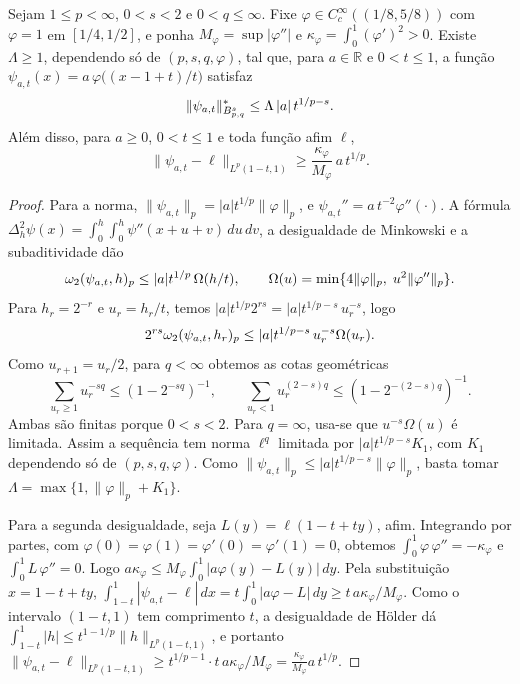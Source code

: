 \documentclass[12pt,a4paper]{article}
\begin{document}
\begin{lema}
\label{lp:lem:bump}
Sejam $1\le p<\infty$, $0<s<2$ e $0<q\le\infty$. Fixe $\varphi\in C^\infty_c((1/8,5/8))$ com $\varphi=1$ em $[1/4,1/2]$, e ponha $M_\varphi=\sup|\varphi''|$ e $\kappa_\varphi=\int_0^1(\varphi')^2>0$. Existe $\Lambda\ge1$, dependendo só de $(p,s,q,\varphi)$, tal que, para $a\in\mathbb R$ e $0<t\le1$, a função $\psi_{a,t}(x)=a\,\varphi\bigl((x-1+t)/t\bigr)$ satisfaz
\[
 \|\psi_{a,t}\|^*_{B^{s}_{p,q}}\le\Lambda\,|a|\,t^{1/p-s}.
\]
Além disso, para $a\ge0$, $0<t\le1$ e toda função afim $\ell$,
\[
 \|\psi_{a,t}-\ell\|_{L^p(1-t,1)}\ge\frac{\kappa_\varphi}{M_\varphi}\,a\,t^{1/p}.
\]
\end{lema}

\begin{proof}
Para a norma, $\|\psi_{a,t}\|_p=|a|t^{1/p}\|\varphi\|_p$, e $\psi_{a,t}''=a\,t^{-2}\varphi''(\cdot)$. A fórmula $\Delta_h^2\psi(x)=\int_0^h\!\int_0^h\psi''(x+u+v)\,du\,dv$, a desigualdade de Minkowski e a subaditividade dão
\[
 \omega_2(\psi_{a,t},h)_{p}\le|a|t^{1/p}\,\Omega(h/t),\qquad \Omega(u)=\min\{4\|\varphi\|_p,\;u^2\|\varphi''\|_p\}.
\]
Para $h_r=2^{-r}$ e $u_r=h_r/t$, temos $|a|t^{1/p}2^{rs}=|a|t^{1/p-s}\,u_r^{-s}$, logo
\[
 2^{rs}\omega_2(\psi_{a,t},h_r)_{p}\le|a|t^{1/p-s}\,u_r^{-s}\Omega(u_r).
\]
Como $u_{r+1}=u_r/2$, para $q<\infty$ obtemos as cotas geométricas
\[
 \sum_{u_r\ge1}u_r^{-sq}\le(1-2^{-sq})^{-1},
 \qquad \sum_{u_r<1}u_r^{(2-s)q}\le(1-2^{-(2-s)q})^{-1}.
\]
Ambas são finitas porque $0<s<2$. Para $q=\infty$, usa-se que $u^{-s}\Omega(u)$ é limitada. Assim a sequência tem norma $\ell^q$ limitada por $|a|t^{1/p-s}K_1$, com $K_1$ dependendo só de $(p,s,q,\varphi)$. Como $\|\psi_{a,t}\|_p\le|a|t^{1/p-s}\|\varphi\|_p$, basta tomar $\Lambda=\max\{1,\|\varphi\|_p+K_1\}$.

Para a segunda desigualdade, seja $L(y)=\ell(1-t+ty)$, afim. Integrando por partes, com $\varphi(0)=\varphi(1)=\varphi'(0)=\varphi'(1)=0$, obtemos $\int_0^1\varphi\,\varphi''=-\kappa_\varphi$ e $\int_0^1 L\,\varphi''=0$. Logo $a\kappa_\varphi\le M_\varphi\int_0^1|a\varphi(y)-L(y)|\,dy$. Pela substituição $x=1-t+ty$, $\int_{1-t}^1|\psi_{a,t}-\ell|\,dx=t\int_0^1|a\varphi-L|\,dy\ge t\,a\kappa_\varphi/M_\varphi$. Como o intervalo $(1-t,1)$ tem comprimento $t$, a desigualdade de Hölder dá $\int_{1-t}^1|h|\le t^{1-1/p}\|h\|_{L^p(1-t,1)}$, e portanto $\|\psi_{a,t}-\ell\|_{L^p(1-t,1)}\ge t^{1/p-1}\cdot t\,a\kappa_\varphi/M_\varphi=\frac{\kappa_\varphi}{M_\varphi}a\,t^{1/p}$.
\end{proof}
\end{document}
